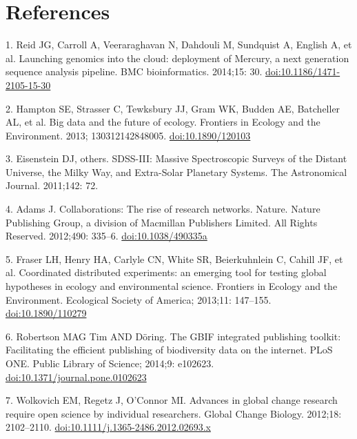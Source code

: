 \documentclass[10pt,letterpaper]{article}
\begin{document}
\newpage

\section*{References}\label{references}


1. Reid JG, Carroll A, Veeraraghavan N, Dahdouli M, Sundquist A, English
A, et al. Launching genomics into the cloud: deployment of Mercury, a
next generation sequence analysis pipeline. BMC bioinformatics. 2014;15:
30.
\href{http://doi.org/10.1186/1471-2105-15-30}{doi:10.1186/1471-2105-15-30}

2. Hampton SE, Strasser C, Tewksbury JJ, Gram WK, Budden AE, Batcheller
AL, et al. Big data and the future of ecology. Frontiers in Ecology and
the Environment. 2013; 130312142848005.
\href{http://doi.org/10.1890/120103}{doi:10.1890/120103}

3. Eisenstein DJ, others. SDSS-III: Massive Spectroscopic Surveys of the
Distant Universe, the Milky Way, and Extra-Solar Planetary Systems. The
Astronomical Journal. 2011;142: 72.

4. Adams J. Collaborations: The rise of research networks. Nature.
Nature Publishing Group, a division of Macmillan Publishers Limited. All
Rights Reserved. 2012;490: 335--6.
\href{http://doi.org/10.1038/490335a}{doi:10.1038/490335a}

5. Fraser LH, Henry HA, Carlyle CN, White SR, Beierkuhnlein C, Cahill
JF, et al. Coordinated distributed experiments: an emerging tool for
testing global hypotheses in ecology and environmental science.
Frontiers in Ecology and the Environment. Ecological Society of America;
2013;11: 147--155.
\href{http://doi.org/10.1890/110279}{doi:10.1890/110279}

6. Robertson MAG Tim AND Döring. The GBIF integrated publishing toolkit:
Facilitating the efficient publishing of biodiversity data on the
internet. PLoS ONE. Public Library of Science; 2014;9: e102623.
\href{http://doi.org/10.1371/journal.pone.0102623}{doi:10.1371/journal.pone.0102623}

7. Wolkovich EM, Regetz J, O'Connor MI. Advances in global change
research require open science by individual researchers. Global Change
Biology. 2012;18: 2102--2110.
\href{http://doi.org/10.1111/j.1365-2486.2012.02693.x}{doi:10.1111/j.1365-2486.2012.02693.x}
\end{document}

